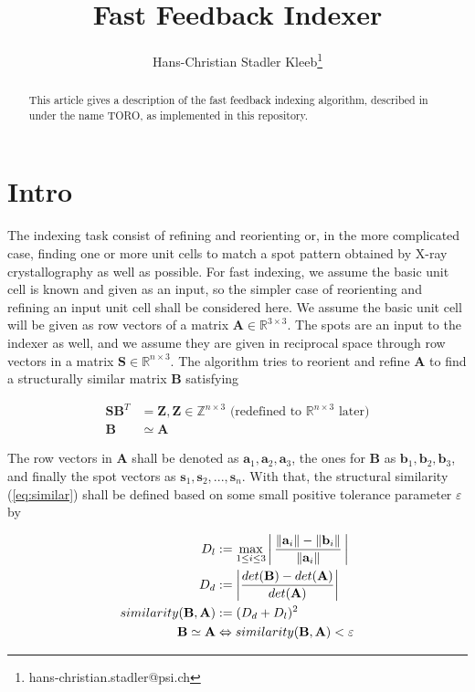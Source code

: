 \documentclass[a4paper,10pt]{article}
\title{Fast Feedback Indexer}
\author{Hans-Christian Stadler Kleeb\thanks{hans-christian.stadler@psi.ch}}
\newcommand{\vect}[1]{\mathbf{#1}}
\newcommand{\mat}[1]{\mathbf{#1}}
\begin{document}
\maketitle

\begin{abstract}
This article gives a description of the fast feedback indexing algorithm, described in \cite{toro-indexer} under the name TORO, as implemented in this repository.
\end{abstract}

\section{Intro}\label{sec:intro}
The indexing task consist of refining and reorienting or, in the more complicated case, finding one or more unit cells to match a spot pattern obtained by X-ray crystallography as well as possible. For fast indexing, we assume the basic unit cell is known and given as an input, so the simpler case of reorienting and refining an input unit cell shall be considered here. We assume the basic unit cell will be given as row vectors of a matrix $\mat{A} \in \mathbb{R}^{3 \times 3}$. The spots are an input to the indexer as well, and we assume they are given in reciprocal space through row vectors in a matrix $\mat{S} \in \mathbb{R}^{n \times 3}$. The algorithm tries to reorient and refine $\mat{A}$ to find a structurally similar matrix $\mat{B}$ satisfying

\begin{align}
 \label{eq:integer} \mat{S} \mat{B}^T &= \mat{Z}, \mat{Z} \in \mathbb{Z}^{n \times 3}\text{ (redefined to }\mathbb{R}^{n\times 3}\text{ later)} \\
 \label{eq:similar} \mat{B} &\simeq \mat{A}
\end{align}

The row vectors in $\mat{A}$ shall be denoted as $\vect{a}_1,\vect{a}_2,\vect{a}_3$, the ones for $\mat{B}$ as $\vect{b}_1,\vect{b}_2,\vect{b}_3$, and finally the spot vectors as $\vect{s}_1, \vect{s}_2, ..., \vect{s}_n$. With that, the structural similarity (\ref{eq:similar}) shall be defined based on some small positive tolerance parameter $\varepsilon$ by

\begin{align}
  D_l &:= \max_{1 \leq i \leq 3} \left |\, \frac{\| \vect{a}_i \| - \| \vect{b}_i \|}{\| \vect{a}_i \|}\, \right | \notag \\
  D_d &:= \left | \frac{det(\mat{B}) - det(\mat{A})}{det(\mat{A})} \right | \notag \\
 similarity(\mat{B}, \mat{A}) &:= ( D_d + D_l )^2 \\
  \mat{B} \simeq \mat{A} &\Leftrightarrow similarity(\mat{B}, \mat{A}) < \varepsilon \notag
\end{align}
\end{document}
